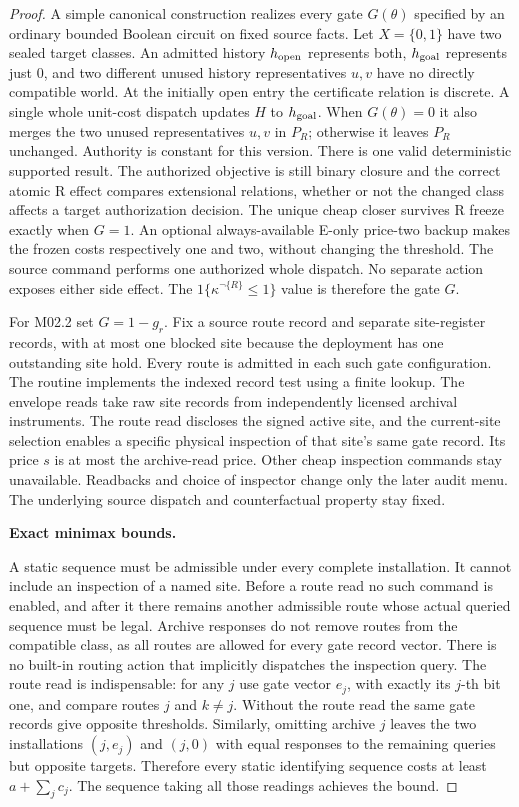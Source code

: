 \begin{proof}
A simple canonical construction realizes every gate \(G(\theta)\) specified by an ordinary bounded Boolean circuit on fixed source facts. Let \(X=\{0,1\}\) have two sealed target classes. An admitted history \(h_{\rm open}\) represents both, \(h_{\rm goal}\) represents just \(0\), and two different unused history representatives \(u,v\) have no directly compatible world. At the initially open entry the certificate relation is discrete. A single whole unit-cost dispatch updates \(H\) to \(h_{\rm goal}\). When \(G(\theta)=0\) it also merges the two unused representatives \(u,v\) in \(P_R\); otherwise it leaves \(P_R\) unchanged. Authority is constant for this version. There is one valid deterministic supported result. The authorized objective is still binary closure and the correct atomic R effect compares extensional relations, whether or not the changed class affects a target authorization decision. The unique cheap closer survives R freeze exactly when \(G=1\). An optional always-available E-only price-two backup makes the frozen costs respectively one and two, without changing the threshold. The source command performs one authorized whole dispatch. No separate action exposes either side effect. The \(1\{\kappa^{\neg\{R\}}\le1\}\) value is therefore the gate \(G\).

For M02.2 set \(G=1-g_r\). Fix a source route record and separate site-register records, with at most one blocked site because the deployment has one outstanding site hold. Every route is admitted in each such gate configuration. The routine implements the indexed record test using a finite lookup. The envelope reads take raw site records from independently licensed archival instruments. The route read discloses the signed active site, and the current-site selection enables a specific physical inspection of that site's same gate record. Its price \(s\) is at most the archive-read price. Other cheap inspection commands stay unavailable. Readbacks and choice of inspector change only the later audit menu. The underlying source dispatch and counterfactual property stay fixed.

\textbf{Exact minimax bounds.}

A static sequence must be admissible under every complete installation. It cannot include an inspection of a named site. Before a route read no such command is enabled, and after it there remains another admissible route whose actual queried sequence must be legal. Archive responses do not remove routes from the compatible class, as all routes are allowed for every gate record vector. There is no built-in routing action that implicitly dispatches the inspection query. The route read is indispensable: for any \(j\) use gate vector \(e_j\), with exactly its \(j\)-th bit one, and compare routes \(j\) and \(k\ne j\). Without the route read the same gate records give opposite thresholds. Similarly, omitting archive \(j\) leaves the two installations \((j,e_j)\) and \((j,0)\) with equal responses to the remaining queries but opposite targets. Therefore every static identifying sequence costs at least \(a+\sum_j c_j\). The sequence taking all those readings achieves the bound.


\end{proof}
